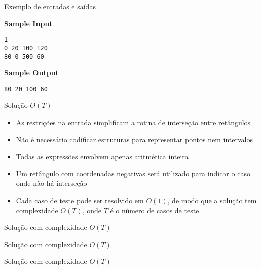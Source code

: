 \begin{frame}[fragile]{Exemplo de entradas e saídas}

\begin{minipage}[t]{0.5\textwidth}
\textbf{Sample Input}
\begin{verbatim}
1
0 20 100 120
80 0 500 60
\end{verbatim}
\end{minipage}
\begin{minipage}[t]{0.45\textwidth}
\textbf{Sample Output}
\begin{verbatim}
80 20 100 60
\end{verbatim}
\end{minipage}
\end{frame}

\begin{frame}[fragile]{Solução $O(T)$}

    \begin{itemize}
        \item As restrições na entrada simplificam a rotina de interseção entre retângulos

        \item Não é necessário codificar estruturas para representar pontos nem intervalos

        \item Todas as expressões envolvem apenas aritmética inteira

        \item Um retângulo com coordenadas negativas será utilizado para indicar o caso onde
            não há interseção

        \item Cada caso de teste pode ser resolvido em $O(1)$, de modo que a solução tem 
            complexidade $O(T)$, onde $T$ é o número de casos de teste
    \end{itemize}

\end{frame}

\begin{frame}[fragile]{Solução com complexidade $O(T)$}
\end{frame}

\begin{frame}[fragile]{Solução com complexidade $O(T)$}
\end{frame}

\begin{frame}[fragile]{Solução com complexidade $O(T)$}
\end{frame}
